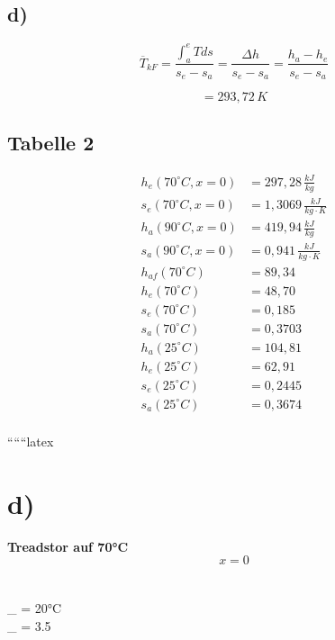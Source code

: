 

\subsection*{d)}

\[
\overline{T}_{kF} = \frac{\int_{a}^{e} T ds}{s_e - s_a} = \frac{\Delta h}{s_e - s_a} = \frac{h_a - h_e}{s_e - s_a}
\]

\[
= 293,72 \, K
\]

\subsection*{Tabelle 2}

\begin{align*}
h_e (70^\circ C, x=0) &= 297,28 \, \frac{kJ}{kg} \\
s_e (70^\circ C, x=0) &= 1,3069 \, \frac{kJ}{kg \cdot K} \\
h_a (90^\circ C, x=0) &= 419,94 \, \frac{kJ}{kg} \\
s_a (90^\circ C, x=0) &= 0,941 \, \frac{kJ}{kg \cdot K} \\
h_{af} (70^\circ C) &= 89,34 \\
h_e (70^\circ C) &= 48,70 \\
s_e (70^\circ C) &= 0,185 \\
s_a (70^\circ C) &= 0,3703 \\
h_a (25^\circ C) &= 104,81 \\
h_e (25^\circ C) &= 62,91 \\
s_e (25^\circ C) &= 0,2445 \\
s_a (25^\circ C) &= 0,3674 \\
\end{align*}

``````latex



\section*{d)}
\textbf{Treadstor auf 70°C} \\
\begin{equation*}
    x = 0
\end{equation*}
 \\
 \\
_{} = 20°C \\
_{} = 3.5  \\

